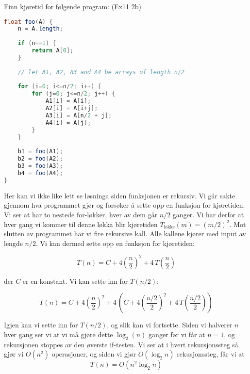 \begin{example} Finn kjøretid for følgende program: (Ex11 2b)
\begin{lstlisting}[language=Java,
commentstyle=\color{source_brown}\monofontitalic, 
morekeywords={String},
keywordstyle=\color{source_blue}\monofontbold,
stringstyle=\color{source_orange}]
float foo(A) {
    n = A.length;
    
    if (n==1) {
        return A[0];
    }
    
    // let A1, A2, A3 and A4 be arrays of length n/2
    
    for (i=0; i<=n/2; i++) {
        for (j=0; j<=n/2; j++) {
            A1[i] = A[i];
            A2[i] = A[i+j];
            A3[i] = A[n/2 + j];
            A4[i] = A[j];
        }
    }
	
    b1 = foo(A1);
    b2 = foo(A2);
    b3 = foo(A3);
    b4 = foo(A4);
}
\end{lstlisting}

Her kan vi ikke like lett se løsninga siden funksjonen er rekursiv. Vi går sakte gjennom hva programmet gjør og forsøker å sette opp en funksjon for kjøretiden. Vi ser at  har to nestede for-løkker, hver av dem går $ n/2 $ ganger. Vi har derfor at hver gang vi kommer til denne løkka blir kjøretiden $ T_{\text{løkke}}(m) = (m/2)^2 $. Mot slutten av programmet har vi fire rekursive kall. Alle kallene kjører  med input av lengde $ n/2 $. Vi kan dermed sette opp en funksjon for kjøretiden:

\[ T(n) = C + 4\left(\frac{n}{2}\right)^2 + 4\,T\left(\frac{n}{2}\right) \]

\noindent der $ C $ er en konstant.  Vi kan sette inn for $ T(n/2) $:

\[ T(n) = C + 4\left(\frac{n}{2}\right)^2 + 4\,\left(C + 4\left(\frac{n/2}{2}\right)^2 + 4\,T\left(\frac{n/2}{2}\right)\right)  \]

Igjen kan vi sette inn for $ T(n/2) $, og slik kan vi fortsette. Siden vi halverer $ n $ hver gang ser vi at vi må gjøre dette $ \log_2(n) $ ganger før vi får at $ n=1 $, og rekursjonen stoppes av den øverste if-testen. Vi ser at i hvert rekursjonssteg så gjør vi $ O(n^2) $ operasjoner, og siden vi gjør $ O(\log_2 n) $ rekusjonssteg, får vi at
\[ T(n) = O(n^2 \log_2 n) \]
\end{example}